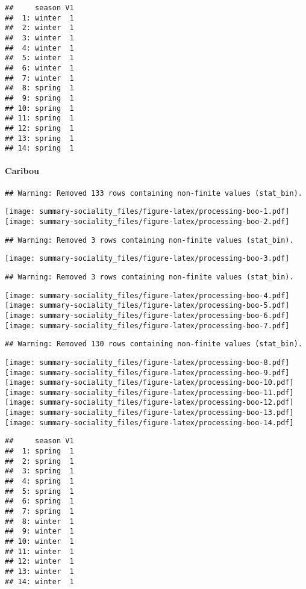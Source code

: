 \documentclass[]{article}
\let\oldparagraph\paragraph
\renewcommand{\paragraph}[1]{\oldparagraph{#1}\mbox{}}
\begin{document}
\begin{verbatim}
##     season V1
##  1: winter  1
##  2: winter  1
##  3: winter  1
##  4: winter  1
##  5: winter  1
##  6: winter  1
##  7: winter  1
##  8: spring  1
##  9: spring  1
## 10: spring  1
## 11: spring  1
## 12: spring  1
## 13: spring  1
## 14: spring  1
\end{verbatim}

\newpage 

\paragraph{Caribou}\label{caribou}

\begin{verbatim}
## Warning: Removed 133 rows containing non-finite values (stat_bin).
\end{verbatim}

\texttt{[image: summary-sociality\_files/figure-latex/processing-boo-1.pdf]}
\texttt{[image: summary-sociality\_files/figure-latex/processing-boo-2.pdf]}

\begin{verbatim}
## Warning: Removed 3 rows containing non-finite values (stat_bin).
\end{verbatim}

\texttt{[image: summary-sociality\_files/figure-latex/processing-boo-3.pdf]}

\begin{verbatim}
## Warning: Removed 3 rows containing non-finite values (stat_bin).
\end{verbatim}

\texttt{[image: summary-sociality\_files/figure-latex/processing-boo-4.pdf]}
\texttt{[image: summary-sociality\_files/figure-latex/processing-boo-5.pdf]}
\texttt{[image: summary-sociality\_files/figure-latex/processing-boo-6.pdf]}
\texttt{[image: summary-sociality\_files/figure-latex/processing-boo-7.pdf]}

\begin{verbatim}
## Warning: Removed 130 rows containing non-finite values (stat_bin).
\end{verbatim}

\texttt{[image: summary-sociality\_files/figure-latex/processing-boo-8.pdf]}
\texttt{[image: summary-sociality\_files/figure-latex/processing-boo-9.pdf]}
\texttt{[image: summary-sociality\_files/figure-latex/processing-boo-10.pdf]}
\texttt{[image: summary-sociality\_files/figure-latex/processing-boo-11.pdf]}
\texttt{[image: summary-sociality\_files/figure-latex/processing-boo-12.pdf]}
\texttt{[image: summary-sociality\_files/figure-latex/processing-boo-13.pdf]}
\texttt{[image: summary-sociality\_files/figure-latex/processing-boo-14.pdf]}

\begin{verbatim}
##     season V1
##  1: spring  1
##  2: spring  1
##  3: spring  1
##  4: spring  1
##  5: spring  1
##  6: spring  1
##  7: spring  1
##  8: winter  1
##  9: winter  1
## 10: winter  1
## 11: winter  1
## 12: winter  1
## 13: winter  1
## 14: winter  1
\end{verbatim}
\end{document}
